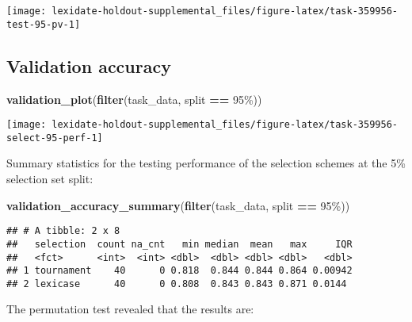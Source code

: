 \documentclass[
]{book}
\newenvironment{Shaded}{\begin{snugshade}}{\end{snugshade}}
\newcommand{\FunctionTok}[1]{\textcolor[rgb]{0.13,0.29,0.53}{\textbf{#1}}}
\newcommand{\NormalTok}[1]{#1}
\newcommand{\SpecialCharTok}[1]{\textcolor[rgb]{0.81,0.36,0.00}{\textbf{#1}}}
\newcommand{\StringTok}[1]{\textcolor[rgb]{0.31,0.60,0.02}{#1}}
\begin{document}
\texttt{[image: lexidate-holdout-supplemental\_files/figure-latex/task-359956-test-95-pv-1]}

\hypertarget{validation-accuracy-29}{%
\subsection{Validation accuracy}\label{validation-accuracy-29}}

\begin{Shaded}
\begin{Highlighting}[]
\FunctionTok{validation\_plot}\NormalTok{(}\FunctionTok{filter}\NormalTok{(task\_data, split }\SpecialCharTok{==} \StringTok{\textquotesingle{}95\%\textquotesingle{}}\NormalTok{))}
\end{Highlighting}
\end{Shaded}

\texttt{[image: lexidate-holdout-supplemental\_files/figure-latex/task-359956-select-95-perf-1]}

Summary statistics for the testing performance of the selection schemes at the 5\% selection set split:

\begin{Shaded}
\begin{Highlighting}[]
\FunctionTok{validation\_accuracy\_summary}\NormalTok{(}\FunctionTok{filter}\NormalTok{(task\_data, split }\SpecialCharTok{==} \StringTok{\textquotesingle{}95\%\textquotesingle{}}\NormalTok{))}
\end{Highlighting}
\end{Shaded}

\begin{verbatim}
## # A tibble: 2 x 8
##   selection  count na_cnt   min median  mean   max     IQR
##   <fct>      <int>  <int> <dbl>  <dbl> <dbl> <dbl>   <dbl>
## 1 tournament    40      0 0.818  0.844 0.844 0.864 0.00942
## 2 lexicase      40      0 0.808  0.843 0.843 0.871 0.0144
\end{verbatim}

The permutation test revealed that the results are:
\end{document}
